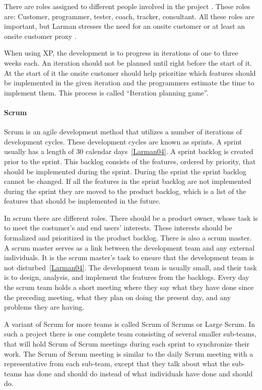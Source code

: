 There are roles assigned to different people involved in the project \cite[p.~145]{Larman04}.
These roles are: Customer, programmer, tester, coach, tracker, consultant.
All these roles are important, but Larman stresses the need for an onsite customer or at least an onsite customer proxy \cite[p.~152-156]{Larman04}.

When using XP, the development is to progress in iterations of one to three weeks each.
An iteration should not be planned until right before the start of it.
At the start of it the onsite customer should help prioritize which features should be implemented in the given iteration and the programmers estimate the time to implement them.
This process is called ``Iteration planning game''.

\paragraph{Scrum}
\label{par:scrum}
Scrum is an agile development method that utilizes a number of iterations of development cycles.
These development cycles are known as sprints.
A sprint usually has a length of 30 calendar days~\ref{Larman04}.
A sprint backlog is created prior to the sprint. 
This backlog consists of the features, ordered by priority, that should be implemented during the sprint.
During the sprint the sprint backlog cannot be changed.
If all the features in the sprint backlog are not implemented during the sprint they are moved to the product backlog, which is a list of the features that should be implemented in the future.

In scrum there are different roles. 
There should be a product owner, whose task is to meet the costumer's and end users' interests. 
These interests should be formalized and prioritized in the product backlog.
There is also a scrum master. 
A scrum master serves as a link between the development team and any external individuals.
It is the scrum master's task to ensure that the development team is not disturbed~\ref{Larman04}.
The development team is usually small, and their task is to design, analysis, and implement the features from the backlogs.
Every day the scrum team holds a short meeting where they say what they have done since the preceding meeting, what they plan on doing the present day, and any problems they are having.

A variant of Scrum for more teams is called Scrum of Scrums or Large Scrum.
In such a project there is one complete team consisting of several smaller sub-teams, that will hold Scrum of Scrum meetings during each sprint to synchronize their work.
The Scrum of Scrum meeting is similar to the daily Scrum meeting with a representative from each sub-team, except that they talk about what the sub-teams has done and should do instead of what individuals have done and should do.

